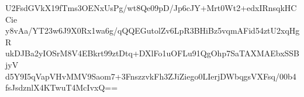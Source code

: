 U2FsdGVkX19fTms3OENxUsPg/wt8Qe09pD/Jp6cJY+Mrt0Wt2+edxIRnsqkHCCie
y8vAa/YT23w6J9X0Rx1wa6g/qQQEGutolZv6LpR3BHiBz5vqmAFid54ztU2xqHgR
ukDJBa2yIOSrM8V4EBkrt99ztDtq+DXlFo1uOFLu91QgOhp7SaTAXMAEbxSSBjyV
d5Y9I5qVapVHvMMV9Saom7+3FnszzvkFh3ZJiZiego0LIerjDWbqgsVXFsq/00b4
fsJsdznlX4KTwuT4McIvxQ==
